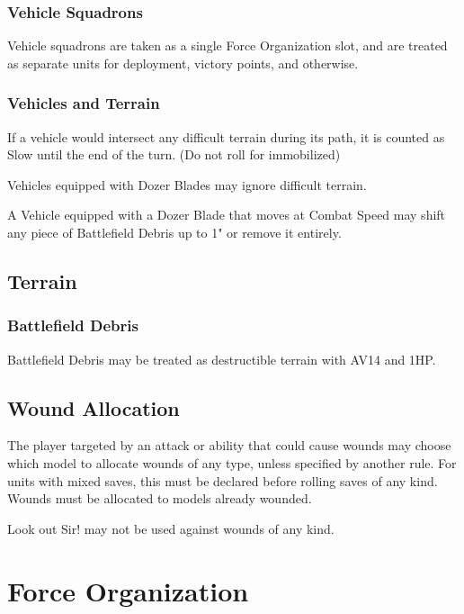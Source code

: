 \documentclass[letterpaper,twocolumn,oneside,titlepage]{book}
\begin{document}
\subsection{\texorpdfstring{\textbf{Vehicle Squadrons}}{Vehicle Squadrons}}\label{vehicle-squadrons}
Vehicle squadrons are taken as a single Force Organization slot,
and are treated as separate units for deployment, victory points, and otherwise.

\subsection{\texorpdfstring{\textbf{Vehicles and Terrain}}{Vehicles and Terrain}}\label{vehicle-terrain}
If a vehicle would intersect any difficult terrain during its path, it is counted as Slow until
the end of the turn. (Do not roll for immobilized)

Vehicles equipped with Dozer Blades may ignore difficult terrain.

A Vehicle equipped with a Dozer Blade that moves at Combat Speed may shift any piece of 
Battlefield Debris up to 1" or remove it entirely.

\section{\texorpdfstring{\textbf{Terrain}}{Terrain}}\label{terrain}
\subsection{\texorpdfstring{\textbf{Battlefield Debris}}{Battlefield Debris}}\label{battlefield-debris}
Battlefield Debris may be treated as destructible terrain with AV14 and 1HP.

\section{\texorpdfstring{\textbf{Wound
Allocation}}{Wound Allocation}}\label{wound-allocation}

The player targeted by an attack or ability that could cause wounds may
choose which model to allocate wounds of any type, unless specified by
another rule. For units with mixed saves, this must be declared before
rolling saves of any kind. Wounds must be allocated to models already
wounded.

Look out Sir! may not be used against wounds of any kind.

\chapter{\texorpdfstring{\textbf{Force
Organization}}{Force Organization}}\label{force-organization}
\end{document}
